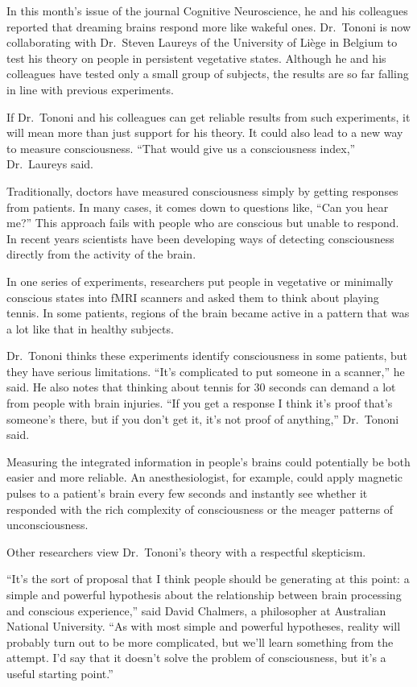 ﻿\documentclass[12pt]{article}
\begin{document}
In this month's issue of the journal Cognitive Neuroscience, he and his colleagues reported that
dreaming brains respond more like wakeful ones. Dr.~Tononi is now collaborating with Dr.~Steven
Laureys of the University of Li\`ege in Belgium to test his theory on people in persistent
vegetative states. Although he and his colleagues have tested only a small group of subjects, the
results are so far falling in line with previous experiments.

If Dr.~Tononi and his colleagues can get reliable results from such experiments, it will mean more
than just support for his theory. It could also lead to a new way to measure consciousness. ``That
would give us a consciousness index,'' Dr.~Laureys said.

Traditionally, doctors have measured consciousness simply by getting responses from patients. In
many cases, it comes down to questions like, ``Can you hear me?'' This approach fails with people
who are conscious but unable to respond. In recent years scientists have been developing ways of
detecting consciousness directly from the activity of the brain.

In one series of experiments, researchers put people in vegetative or minimally conscious states
into fMRI scanners and asked them to think about playing tennis. In some patients, regions of the
brain became active in a pattern that was a lot like that in healthy subjects.

Dr.~Tononi thinks these experiments identify consciousness in some patients, but they have serious
limitations. ``It's complicated to put someone in a scanner,'' he said. He also notes that thinking
about tennis for 30 seconds can demand a lot from people with brain injuries. ``If you get a
response I think it's proof that's someone's there, but if you don't get it, it's not proof of
anything,'' Dr.~Tononi said.

Measuring the integrated information in people's brains could potentially be both easier and more
reliable. An anesthesiologist, for example, could apply magnetic pulses to a patient's brain every
few seconds and instantly see whether it responded with the rich complexity of consciousness or the
meager patterns of unconsciousness.

Other researchers view Dr.~Tononi's theory with a respectful skepticism.

``It's the sort of proposal that I think people should be generating at this point: a simple and
powerful hypothesis about the relationship between brain processing and conscious experience,'' said
David Chalmers, a philosopher at Australian National University. ``As with most simple and powerful
hypotheses, reality will probably turn out to be more complicated, but we'll learn something from
the attempt. I'd say that it doesn't solve the problem of consciousness, but it's a useful starting
point.''
\end{document}
